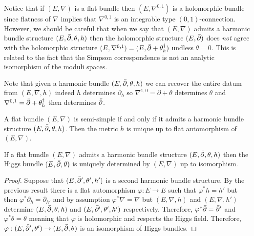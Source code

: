 \documentclass[12pt]{article}
\begin{document}
\begin{rmk}
Notice that if $(E, \nabla)$ is a flat bundle then $(E, \nabla^{0,1})$ is a holomorphic bundle since flatness of $\nabla$ implies that $\nabla^{0,1}$ is an integrable type $(0,1)$-connection. However, we should be careful that when we say that $(E, \nabla)$ admits a harmonic bundle structure $(E, \bar{\partial}, \theta, h)$ then the holomorphic structure $(E, \bar{\partial})$ does \textit{not} agree with the holomorphic structure $(E, \nabla^{0,1}) = (E, \bar{\partial} + \theta_h^\dagger)$ undless $\theta = 0$. This is related to the fact that the Simpson correspondence is not an analytic isomorphism of the moduli spaces.
\end{rmk}

\begin{rmk}
Note that given a harmonic bundle $(E, \bar{\partial}, \theta, h)$ we can recover the entire datum from $(E, \nabla, h)$ indeed $h$ determines $\partial_h$ so $\nabla^{1,0} = \partial + \theta$ determines $\theta$ and $\nabla^{0,1} = \bar{\partial} + \theta_h^\dagger$ then determines $\bar{\partial}$.
\end{rmk}

\begin{theorem}[Simpson]
A flat bundle $(E, \nabla)$ is semi-simple if and only if it admits a harmonic bundle structure $(E, \bar{\partial}, \theta, h)$. Then the metric $h$ is unique up to flat automorphism of $(E, \nabla)$.
\end{theorem}

\begin{cor}
If a flat bundle $(E, \nabla)$ admits a harmonic bundle structure $(E, \bar{\partial}, \theta, h)$ then the Higgs bundle $(E, \bar{\partial}, \theta)$ is uniquely determined by $(E, \nabla)$ up to isomorphism.
\end{cor}

\begin{proof}
Suppose that $(E, \bar{\partial}', \theta', h')$ is a second harmonic bundle structure. By the previous result there is a flat automorphism $\varphi : E \to E$ such that $\varphi^* h = h'$ but then $\varphi^* \partial_h = \partial_{h'}$ and by assumption $\varphi^* \nabla = \nabla$ but $(E, \nabla, h)$ and $(E, \nabla, h')$ determine $(E, \bar{\partial}, \theta, h)$ and $(E, \bar{\partial}', \theta', h')$ respectively. Therefore, $\varphi^* \bar{\partial} = \bar{\partial}'$ and $\varphi^* \theta = \theta$ meaning that $\varphi$ is holomorphic and respects the Higgs field. Therefore, $\varphi : (E, \bar{\partial}', \theta') \to (E, \bar{\partial}, \theta)$ is an isomorphism of Higgs bundles. 
\end{proof}
\end{document}
